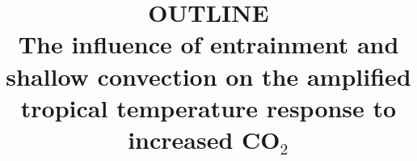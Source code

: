 \documentclass[draft]{agujournal2019}
\begin{document}
%
%


\title{OUTLINE\\The influence of entrainment and shallow convection on the amplified tropical temperature response to increased CO$_2$}

%
%










\end{document}
